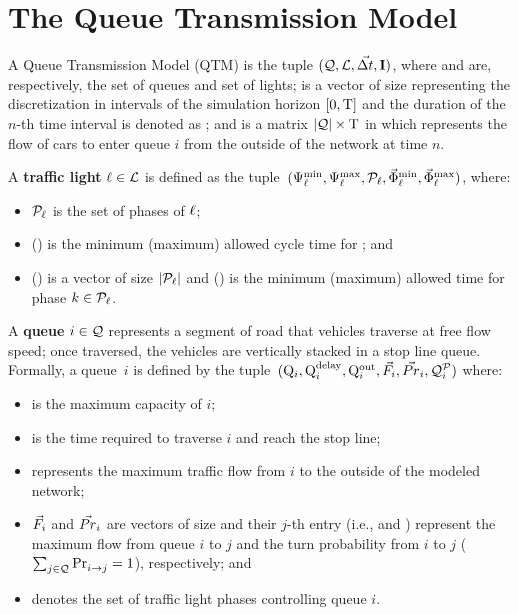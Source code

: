 \section{The Queue Transmission Model}


A Queue Transmission Model (QTM) is the tuple $(\mathcal{Q}, \mathcal{L}, \vec{\Delta t}, \mathbf{I})$,
where \Qset and \Lset are, respectively, the set of queues and set of lights;
%
\vecDT is a vector of size \Nn representing the discretization in intervals of
the simulation horizon $[0,\mathrm{T}]$ and the duration  of the
$n$-th time interval is denoted as \DT[n];
%
%
and \MatQIN is a matrix $|\mathcal{Q}| \times \mathrm{T}$ in which  represents the
flow of cars  to enter queue $i$ from the outside of the network
at time $n$.



A \textbf{traffic light} $\ell \in \mathcal{L}$ is defined as the tuple~$(\mathrm{\Psi}_{\ell}^{\mathrm{min}},
\mathrm{\Psi}_{\ell}^{\mathrm{max}}, \mathcal{P}_\ell, \vec{\mathrm{\Phi}}_{\ell}^{\mathrm{min}}, \vec{\mathrm{\Phi}}_{\ell}^{\mathrm{max}})$, where:

\begin{itemize}
%
\item $\mathcal{P}_\ell$ is the set of phases of $\ell$;
%
\item \CTMIN{\tl} (\CTMAX{\tl}) is the minimum (maximum) allowed cycle time for
  \tl; and
%
\item \VecPTMIN{\tl} (\VecPTMAX{\tl}) is a vector of size $|\mathcal{P}_\ell|$ and
   () is the minimum (maximum) allowed time for
  phase $k \in \mathcal{P}_\ell$. 
%
\end{itemize}


A \textbf{queue} $i \in \mathcal{Q}$ represents a segment of road that vehicles
traverse at free flow speed; once traversed, the vehicles are vertically stacked
in a stop line queue.
%
Formally, a queue~$i$ is defined by the tuple~$(\mathrm{Q}_{i}, \mathrm{Q}_{i}^{\mathrm{delay}}, \mathrm{Q}_{i}^{\mathrm{out}},
\vec{F}_i, \vec{Pr}_i, \mathcal{Q}_{i}^{\mathcal{P}})$ where:

\begin{itemize}
%
\item {} is the maximum capacity of $i$;
%
\item {} is the time required to traverse $i$ and reach the stop line;
%
\item {} represents the maximum traffic flow from $i$ to the outside of
  the modeled network;
%
\item $\vec{F}_i$ and $\vec{Pr}_i$ are vectors of size \Qn and their $j$-th entry
  (i.e.,  and ) represent the maximum flow from queue $i$
  to $j$ and the turn probability from $i$ to $j$ ($\sum_{j \in
  \mathcal{Q}}\mathrm{Pr}_{i\to j}^{\mathrm{}} = 1$), respectively; and
%
\item {} denotes the set of traffic light phases controlling queue $i$.
%
\end{itemize}


